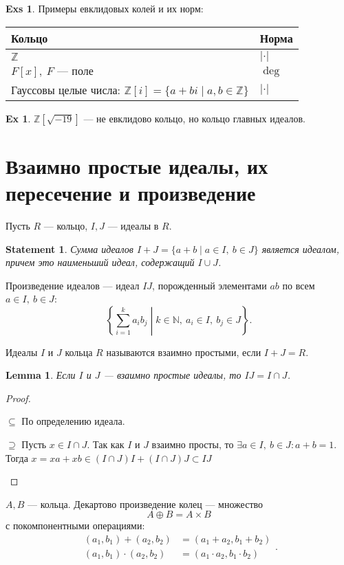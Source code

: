 \documentclass[11pt]{book}
\newcommand{\Z}{\mathbb{Z}}
\newcommand{\N}{\mathbb{N}}
\theoremstyle{definition}
\theoremstyle{plain}
\theoremstyle{plain}
\newtheorem{lm}{Lemma}
\newtheorem{st}{Statement}
\theoremstyle{definition}
\newtheorem*{ex}{Ex}
\newtheorem*{exs}{Exs}
\theoremstyle{remark}
\begin{document}
\begin{exs}
    Примеры евклидовых колей и их норм:

    \begin{tabular}[ht]{l|l}
	\hline
	Кольцо & Норма\\
	\hline
	$ \Z$ &$ |\cdot|$\\
	$ F[x], ~ F \text{ --- поле}$ & $  \deg$\\
	Гауссовы целые числа: $ \Z[i] = \{a + bi \mid a, b \in\Z\}$ & $ |\cdot|$
    \end{tabular}
\end{exs}
\begin{ex}
    $ \Z [\sqrt{-19}]$ --- не евклидово кольцо, но кольцо главных идеалов.
\end{ex}
\section{Взаимно простые идеалы, их пересечение и произведение}
Пусть $ R$ --- кольцо,  $ I, J$ --- идеалы в  $ R$.
\begin{st}
    Сумма идеалов $ I + J = \{a + b \mid a \in I, ~ b \in  J\}$ является идеалом, причем это наименьший идеал, содержащий $ I\cup  J$.
\end{st}
\begin{defn}
    {\sf Произведение идеалов}  --- идеал $ I J$, порожденный элементами $ ab$ по всем $ a \in I, ~ b \in J$:
    \[
	\left\{ \sum_{i = 1}^{k} a_{i}b_j \middle| k \in \N, ~ a_i \in I, ~ b_j \in  J \right\}
    .\]
\end{defn}
\begin{defn}
    Идеалы $ I$ и $ J$ кольца $ R$ называются {\sf взаимно простыми}, если  $ I + J = R$.
\end{defn}
\begin{lm}
    Если $ I$ и  $ J$ ---  взаимно простые идеалы, то  $ IJ =I \cap  J $.
\end{lm}
\begin{proof}
    $ $
    \begin{description}
	\item $ \boxed{ \subseteq }$ По определению идеала.
	\item $ \boxed{\supseteq}$ Пусть $ x \in I \cap J$. Так как $ I$ и  $ J$ взаимно просты, то  $ \exists a \in I, ~ b \in J: a+ b = 1$. Тогда $ x = xa + xb \in (I \cap J) I + (I \cap J) J \subset IJ$
    \end{description}
\end{proof}
\begin{defn}
    $ A, B$ --- кольца. {\sf Декартово произведение} колец --- множество
    \[
	A \oplus B = A \times  B
    \]
    с покомпонентными операциями:
    \[
	\begin{aligned}
	    (a_1, b_1) + (a_2, b_2) &= (a_1 + a_2, b_1 +b_2) \\
	    (a_1, b_1) \cdot  (a_2, b_2) &= (a_1 \cdot  a_2, b_1 \cdot b_2)
	\end{aligned}
    .\]
\end{defn}
\end{document}
